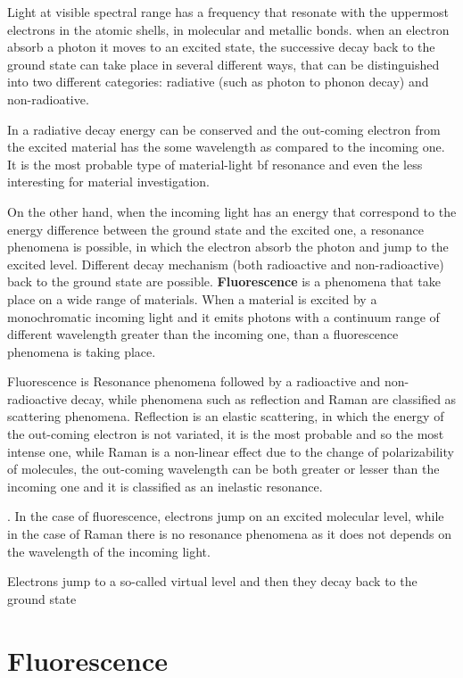 Light at visible spectral range has a frequency that resonate with the uppermost electrons in the atomic shells, in molecular and metallic bonds. when an electron absorb a photon it moves to an excited state, the successive decay back to the ground state can take place in several different ways, that can be distinguished into two different categories: radiative (such as photon to phonon decay) and non-radioative.

In a radiative decay energy can be conserved and the out-coming electron from the excited material has the some wavelength as compared to the incoming one. It is the most probable type of material-light {bf resonance} and even the less interesting for material investigation.

On the other hand, when the incoming light has an energy that correspond to the energy difference between the ground state and the excited one, a resonance phenomena is possible, in which the electron absorb the photon and jump to the excited level. Different decay mechanism (both radioactive and non-radioactive) back to the ground state are possible.
{\bf Fluorescence} is a phenomena that take place on a wide range of materials. When a material is excited by a monochromatic incoming light and it emits photons with a continuum range of different wavelength greater than the incoming one, than a fluorescence phenomena is taking place.

Fluorescence is Resonance phenomena followed by a radioactive and non-radioactive decay, while phenomena such as reflection and Raman are classified as scattering phenomena.
Reflection is an elastic scattering, in which the energy of the out-coming electron is not variated, it is the most probable and so the most intense one, while Raman is a non-linear effect due to the change of polarizability of molecules, the out-coming wavelength can be both greater or lesser than the incoming one and it is classified as an inelastic resonance.

. In the case of fluorescence, electrons jump on an excited molecular level, while in the case of Raman there is no resonance phenomena as it does not depends on the wavelength of the incoming light.

Electrons jump to a so-called virtual level and then they decay back to the ground state


\section{Fluorescence}


